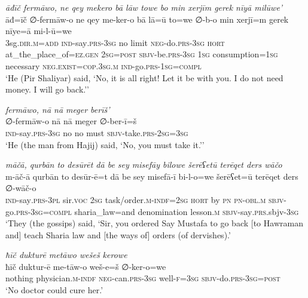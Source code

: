 \ea \label{ŽP.105}
\textit{āđīč fermāwo, ne qey mekero bā lāw towe bo min xerjīm gerek nīyā milūwe’} \\ 
\gll āđ=īč ∅-fermāw-o ne qey me-ker-o bā lā=ū to=we ∅-b-o min xerjī=m gerek nīye=ā mi-l-ū=we \\ 
 3sg\textsc{.dir}\textsc{.m}\textsc{=add} \textsc{ind-}say\textsc{.prs}\textsc{-3sg} no limit \textsc{neg-}do\textsc{.prs}\textsc{-3sg} \textsc{hort} at\_the\_place\_of\textsc{\textsc{=ez.gen}} \textsc{2sg}\textsc{=\textsc{post}} \textsc{sbjv-}be\textsc{.prs}\textsc{-3sg} \textsc{1sg} consumption\textsc{=\textsc{1sg}} necessary \textsc{\textsc{neg.}exist}\textsc{=cop}\textsc{.3sg}\textsc{.m} \textsc{ind-}go\textsc{.prs}\textsc{-\textsc{1sg}}\textsc{=compl} \\ 
\glt `He (Pir Shaliyar) said, ‘No, it is all right! Let it be with you. I do not need money. I will go back.’'
\z 
 
\ea \label{ŽP.106}
\textit{fermāwo, nā nā meger berīš’} \\ 
\gll ∅-fermāw-o nā nā meger ∅-ber-ī=š \\ 
 \textsc{ind-}say\textsc{.prs}\textsc{-3sg} no no must \textsc{sbjv-}take\textsc{.prs}-\textsc{2sg}\textsc{=3sg} \\ 
\glt `He (the man from Hajij) said, ‘No, you must take it.’'
\z 
 
\ea \label{ŽP.126}
\textit{māčā, qurbān to desūrēt dā be sey misefāy bilowe šerēʕetū terēqet ders wāčo} \\ 
\gll m-āč-ā qurbān to desūr-ē=t dā be sey misefā-ī bi-l-o=we šerēʕet=ū terēqet ders ∅-wāč-o \\ 
 \textsc{ind-}say\textsc{.prs}\textsc{-3pl} sir.\textsc{voc} \textsc{2sg} task/order\textsc{.m}\textsc{-indf}\textsc{=\textsc{2sg}} \textsc{hort} by \textsc{pn} \textsc{pn}\textsc{-obl}\textsc{.m} \textsc{sbjv-}go\textsc{.prs}\textsc{-3sg}\textsc{=compl} sharia\_law=and denomination lesson\textsc{.m} \textsc{sbjv-}say\textsc{.prs}.sbjv\textsc{-3sg} \\ 
\glt `They (the gossips) said, ‘Sir, you ordered Say Mustafa to go back [to Hawraman and] teach Sharia law and [the ways of] orders (of dervishes).'
\z 
 
\ea \label{ŽP.147}
\textit{ħīč dukturē metāwo wešeš kerowe} \\ 
\gll ħīč duktur-ē me-tāw-o weš-e=š ∅-ker-o=we \\ 
 nothing physician\textsc{.m}\textsc{-indf} \textsc{neg-}can\textsc{.prs}\textsc{-3sg} well\textsc{-f}\textsc{=3sg} \textsc{sbjv-}do\textsc{.prs}\textsc{-3sg}\textsc{=\textsc{post}} \\ 
\glt `No doctor could cure her.'
\z 
 
